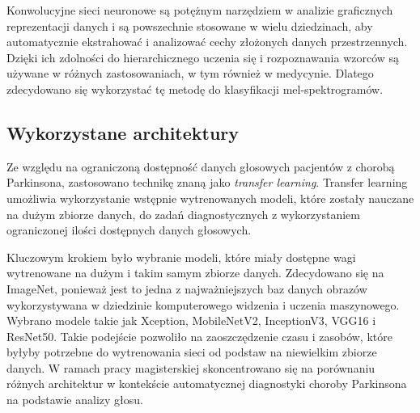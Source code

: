 Konwolucyjne sieci neuronowe są potężnym narzędziem w analizie graficznych reprezentacji danych i są powszechnie stosowane w wielu dziedzinach, aby automatycznie ekstrahować i analizować cechy złożonych danych przestrzennych.
Dzięki ich zdolności do hierarchicznego uczenia się i rozpoznawania wzorców są używane w różnych zastosowaniach, w tym również w medycynie.
Dlatego zdecydowano się wykorzystać tę metodę do klasyfikacji mel-spektrogramów.

\subsection{Wykorzystane architektury}
\label{subsec:architektury}

Ze względu na ograniczoną dostępność danych głosowych pacjentów z chorobą Parkinsona, zastosowano technikę znaną jako \emph{transfer learning}.
Transfer learning umożliwia wykorzystanie wstępnie wytrenowanych modeli, które zostały nauczane na dużym zbiorze danych,
do zadań diagnostycznych z wykorzystaniem ograniczonej ilości dostępnych danych głosowych.

Kluczowym krokiem było wybranie modeli, które miały dostępne wagi wytrenowane na dużym i takim samym zbiorze danych.
Zdecydowano się na ImageNet, ponieważ jest to jedna z najważniejszych baz danych obrazów wykorzystywana w dziedzinie komputerowego widzenia i uczenia maszynowego.
Wybrano modele takie jak Xception, MobileNetV2, InceptionV3, VGG16 i ResNet50.
Takie podejście pozwoliło na zaoszczędzenie czasu i zasobów, które byłyby potrzebne do wytrenowania sieci od podstaw na niewielkim zbiorze danych.
W ramach pracy magisterskiej skoncentrowano się na porównaniu różnych architektur w kontekście automatycznej diagnostyki choroby Parkinsona na podstawie analizy głosu.

